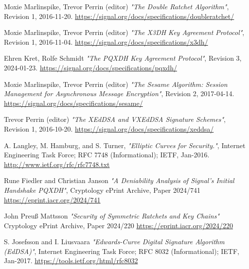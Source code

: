 \documentclass[a4paper,11pt]{article}
\begin{document}
\newpage
\begin{thebibliography}{99}

  Moxie Marlinspike, Trevor Perrin (editor)
  \textit{\: "The Double Ratchet Algorithm"},
  Revision 1,
  2016-11-20.
  \href{https://signal.org/docs/specifications/doubleratchet/}{https://signal.org/docs/specifications/doubleratchet/}

  Moxie Marlinspike, Trevor Perrin (editor)
  \textit{\: "The X3DH Key Agreement Protocol"},
  Revision 1,
  2016-11-04.
  \href{https://signal.org/docs/specifications/x3dh/}{https://signal.org/docs/specifications/x3dh/}

  Ehren Kret, Rolfe Schmidt
  \textit{\: "The PQXDH Key Agreement Protocol"},
  Revision 3,
  2024-01-23.
  \href{https://signal.org/docs/specifications/pqxdh/}{https://signal.org/docs/specifications/pqxdh/}

  Moxie Marlinspike, Trevor Perrin (editor)
  \textit{\: "The Sesame Algorithm: Session Management for Asynchronous Message Encryption"},
  Revision 2,
  2017-04-14.
  \href{https://signal.org/docs/specifications/sesame/}{https://signal.org/docs/specifications/sesame/}

  Trevor Perrin (editor)
  \textit{\: "The XEdDSA and VXEdDSA Signature Schemes"},
  Revision 1,
  2016-10-20.
  \href{https://signal.org/docs/specifications/xeddsa/}{https://signal.org/docs/specifications/xeddsa/}

  A. Langley, M. Hamburg, and S. Turner,
  \textit{\: "Elliptic Curves for Security."},
  Internet Engineering Task Force; RFC 7748 (Informational); IETF, Jan-2016.
  \href{http://www.ietf.org/rfc/rfc7748.txt}{http://www.ietf.org/rfc/rfc7748.txt}

  Rune Fiedler and Christian Janson
  \textit{\: "A Deniability Analysis of Signal's Initial Handshake PQXDH"},
  Cryptology ePrint Archive, Paper 2024/741
  \href{https://eprint.iacr.org/2024/741}{https://eprint.iacr.org/2024/741}

  John Preuß Mattsson
  \textit{\: "Security of Symmetric Ratchets and Key Chains"}
  Cryptology ePrint Archive, Paper 2024/220
  \href{https://eprint.iacr.org/2024/220}{https://eprint.iacr.org/2024/220}

  S. Josefsson and I. Liusvaara
  \textit{\: "Edwards-Curve Digital Signature Algorithm (EdDSA)"},
  Internet Engineering Task Force; RFC 8032 (Informational); IETF, Jan-2017.
  \href{https://tools.ietf.org/html/rfc8032}{https://tools.ietf.org/html/rfc8032}


\end{thebibliography}
\end{document}
